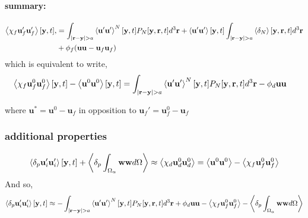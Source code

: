 \paragraph{summary:}
\begin{align*}
    \avg{\chi_f \textbf{u}'_f\textbf{u}_f'}[\textbf{y},t],
    &=
    \int_{|\textbf{r}-\textbf{y}|>a}
    \avg{\textbf{u}'\textbf{u}'}^N[\textbf{y},t] P_N[\textbf{y},\textbf{r},t]
    d^3 \textbf{r}
    + 
    \avg{\textbf{u}'\textbf{u}'}[\textbf{y},t]
    \int_{|\textbf{r}-\textbf{y}|>a}
    \avg{\delta_N}[\textbf{y},\textbf{r},t] 
    d^3 \textbf{r}\\
    &+ \phi_f (\textbf{uu} - \textbf{u}_f \textbf{u}_f ) 
\end{align*}
which is equivalent to write, 
\begin{align*}
    \avg{\chi_f \textbf{u}^0_f\textbf{u}_f^0}[\textbf{y},t]
    - \avg{\textbf{u}^0\textbf{u}^0}[\textbf{y},t]
    &=
    \int_{|\textbf{r}-\textbf{y}|>a}
    \avg{\textbf{u}'\textbf{u}'}^N[\textbf{y},t] P_N[\textbf{y},\textbf{r},t]
    d^3 \textbf{r}
    - \phi_d \textbf{uu} 
\end{align*}


where $\textbf{u}^* = \textbf{u}^0 - \textbf{u}_f$ in opposition to $\textbf{u}_f' = \textbf{u}_f^0 - \textbf{u}_f$

\subsubsection{additional properties}
\begin{equation}
    \left<\delta_{p} \textbf{u}_i'\textbf{u}_i'\right>[\textbf{y},t]
    +  \left<\delta_{p} \int_{\Omega_{\alpha}} \textbf{ww} d\Omega\right>
    \approx
    \left<\chi_d \textbf{u}_d^0 \textbf{u}_d^0\right>
    = 
    \left<\textbf{u}^0 \textbf{u}^0\right>
    - \left<\chi_f \textbf{u}_f^0 \textbf{u}_f^0\right>
\end{equation}
And so, 
\begin{equation}
    \pavg{\textbf{u}_i'\textbf{u}_i'}[\textbf{y},t]
    \approx
    - \int_{|\textbf{r}-\textbf{y}|>a}
    \avg{\textbf{u}'\textbf{u}'}^N[\textbf{y},t] P_N[\textbf{y},\textbf{r},t]
    d^3 \textbf{r}
    + \phi_d \textbf{uu} 
    - \avg{\chi_f \textbf{u}_f^0 \textbf{u}_f^0}
    - \pOavg{\textbf{ww}}
\end{equation}


